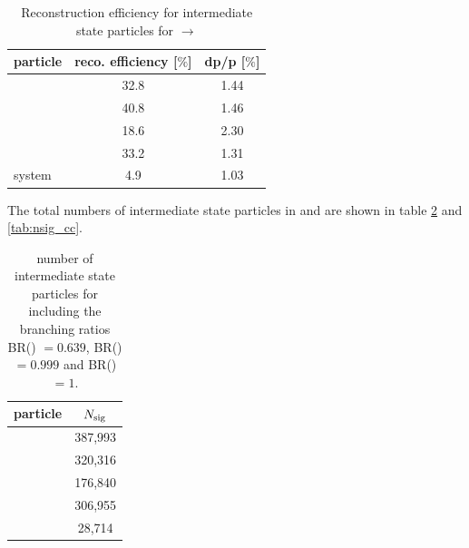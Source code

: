 		\begin{table}
		\centering
		\caption{\propose Reconstruction efficiency for intermediate state particles for \pbarp $\rightarrow$ \excitedanticascade \cascade}
		\label{tab:intermediatestate_efficiency_cc}
		
		\begin{tabular}{lcc}
		
			\hline
			particle & reco. efficiency [$\%$] & dp/p [$\%$] \\\hline
			\hline
			\lam & 32.8 &   1.44 \\
			\alam & 40.8 &   1.46\\
			\cascade & 18.6&   2.30\\
			\excitedanticascade & 33.2&   1.31\\
			\excitedanticascade \cascade system & 4.9&   1.03\\\hline
			 	
		\end{tabular}
	\end{table}
	The total numbers of intermediate state particles in \mychannel and \myccchannel are shown in table \ref{tab:nsig} and \ref{tab:nsig_cc}. 
	
	\begin{table}
		\centering
		\caption{number of intermediate state particles for \mychannel including the branching ratios BR() $=0.639$, BR(\decay{\cascade}{\lam}{\piminus})
		 $= 0.999$ and BR(\decay{\excitedcascade}{\lam}{\kminus}) $ =1$.}
		 \label{tab:nsig}
		 
		 \begin{tabular}{lc}
		 	\hline
		 	particle & $N_{\textnormal{sig}}$ \\\hline
		 	\hline
		 	\lam & 387,993 \\
		 	\alam & 320,316 \\
		 	\anticascade & 176,840 \\
		 	\excitedcascade & 306,955 \\
		 	\excitedcascade \anticascade &  28,714\\\hline
		 	
		 \end{tabular}
	\end{table}
	 
